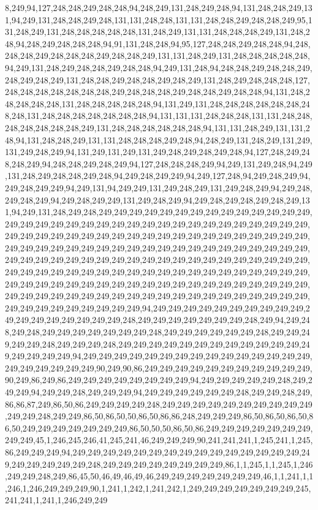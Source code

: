 8,249,94,127,248,248,249,248,248,94,248,249,131,248,249,248,94,131,248,248,249,131,94,249,131,248,248,249,248,131,131,248,248,131,131,248,248,249,248,248,249,95,131,248,249,131,248,248,248,248,248,131,248,249,131,131,248,248,248,249,131,248,248,94,248,249,248,248,248,94,91,131,248,248,94,95,127,248,248,249,248,248,94,248,248,248,249,248,248,248,249,248,248,249,131,131,248,249,131,248,248,248,248,248,94,249,131,248,249,248,248,249,248,248,94,249,131,248,94,248,248,249,248,248,249,248,249,248,249,131,248,248,249,248,248,249,248,249,131,248,249,248,248,248,127,248,248,248,248,248,248,248,249,248,248,248,249,248,248,249,248,248,94,131,248,248,248,248,248,131,248,248,248,248,248,94,131,249,131,248,248,248,248,248,248,248,248,131,248,248,248,248,248,248,248,94,131,131,131,248,248,248,131,131,248,248,248,248,248,248,248,249,131,248,248,248,248,248,248,94,131,131,248,249,131,131,248,94,131,248,248,249,131,131,248,248,248,249,248,94,248,249,131,248,249,131,249,131,249,248,249,94,131,249,131,249,131,249,248,249,248,249,248,94,127,248,249,248,248,249,94,248,248,249,248,249,94,127,248,248,248,249,94,249,131,249,248,94,249,131,248,249,248,248,249,248,94,249,248,249,249,94,249,127,248,94,249,248,249,94,249,248,249,249,94,249,131,94,249,249,131,249,248,249,131,249,248,249,94,249,248,249,248,249,94,249,248,249,249,131,249,248,249,94,249,248,249,248,249,248,249,131,94,249,131,248,249,248,249,249,249,249,249,249,249,249,249,249,249,249,249,249,249,249,249,249,249,249,249,249,249,249,249,249,249,249,249,249,249,249,249,249,249,249,249,249,249,249,249,249,249,249,249,249,249,249,249,249,249,249,249,249,249,249,249,249,249,249,249,249,249,249,249,249,249,249,249,249,249,249,249,249,249,249,249,249,249,249,249,249,249,249,249,249,249,249,249,249,249,249,249,249,249,249,249,249,249,249,249,249,249,249,249,249,249,249,249,249,249,249,249,249,249,249,249,249,249,249,249,249,249,249,249,249,249,249,249,249,249,249,249,249,249,249,249,249,249,249,249,249,249,249,249,249,249,249,249,249,249,249,249,249,249,249,249,249,249,249,249,249,249,94,249,249,249,249,249,249,249,249,249,249,249,249,249,249,249,249,249,249,248,249,249,249,249,249,249,249,248,249,94,249,248,249,248,249,249,249,249,249,249,249,248,249,249,249,249,249,249,248,249,249,249,249,249,248,249,249,249,248,249,249,249,249,249,249,249,249,249,249,249,249,249,249,249,249,249,94,249,249,249,249,249,249,249,249,249,249,249,249,249,249,249,249,249,249,249,249,249,90,249,90,86,249,249,249,249,249,249,249,249,249,249,249,90,249,86,249,86,249,249,249,249,249,249,249,249,94,249,249,249,249,249,248,249,249,249,94,249,249,248,249,249,249,94,249,249,249,249,249,249,248,249,249,248,249,86,86,87,249,86,50,86,249,249,249,249,248,249,249,249,249,249,249,249,249,249,249,249,249,248,249,249,86,50,86,50,50,86,50,86,86,248,249,249,249,86,50,86,50,86,50,86,50,249,249,249,249,249,249,249,86,50,50,50,86,50,86,249,249,249,249,249,249,249,249,249,45,1,246,245,246,41,245,241,46,249,249,249,90,241,241,241,1,245,241,1,245,86,249,249,249,94,249,249,249,249,249,249,249,249,249,249,249,249,249,249,249,249,249,249,249,249,249,248,249,249,249,249,249,249,249,249,86,1,1,245,1,1,245,1,246,249,249,248,249,86,45,50,46,49,46,49,46,249,249,249,249,249,249,249,46,1,1,241,1,1,246,1,246,249,249,249,90,1,241,1,242,1,241,242,1,249,249,249,249,249,249,249,245,241,241,1,241,1,246,249,249